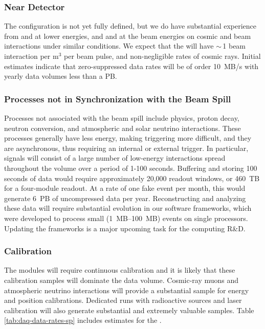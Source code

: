 \subsubsection{Near Detector} 
\label{sec:exec-comp-dt-nd}

The  configuration is not yet fully defined,  but we do have substantial experience from  and   at lower energies, and   and  at the   beam energies on cosmic and beam interactions under similar conditions.  We expect that the   will have $\sim\,$1 beam interaction per m$^3$ per beam pulse, and non-negligible rates of cosmic rays. Initial estimates indicate that zero-suppressed data rates will be of order \SI{10}{MB/s} with yearly data volumes less than a PB.  

\subsubsection{Processes not in Synchronization with the Beam Spill} 
\label{sec:exec-comp-dt-psbs}

Processes not associated with the beam spill %
include  physics, proton decay, neutron conversion, and atmospheric and solar neutrino interactions.  These processes generally have less energy, making triggering more difficult, and they are  asynchronous, thus requiring an internal or external trigger.  In particular,  signals will consist of a large number of low-energy interactions spread throughout the  volume over a period of 1-100 seconds. Buffering and storing 100 seconds of  data would require approximately 20,000 readout windows, or \SI{460}{TB} for a four-module  readout.  At a rate of one fake  event per month, this would generate  \SI{6}{PB} of uncompressed data per year.  Reconstructing and analyzing these data will require substantial evolution in our software frameworks, which were developed to process small (\SIrange{1}{100}{MB}) events on single processors. %
Updating the frameworks is a major upcoming task for the  computing R\&D. %

\subsubsection{Calibration}
\label{sec:exec-comp-cal}

The  modules will require continuous calibration and it is likely that these calibration samples %
will dominate the data volume. Cosmic-ray muons and atmospheric neutrino interactions will provide a substantial sample for energy and position calibrations.  Dedicated runs with radioactive sources and laser calibration will also generate substantial and extremely valuable samples. Table \ref{tab:daq-data-rates-sp} includes estimates for the %
. 

